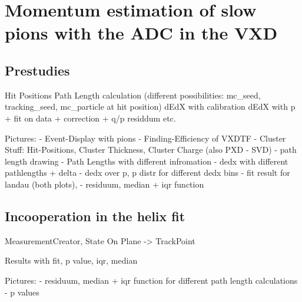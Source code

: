 \chapter{Momentum estimation of slow pions with the ADC in the VXD}

\section{Prestudies}

Hit Positions
Path Length calculation (different possibilities: mc_seed, tracking_seed, mc_particle at hit position)
dEdX with calibration
dEdX with p + fit on data + correction + q/p residdum etc.

Pictures:
- Event-Display with pions
- Finding-Efficiency of VXDTF
- Cluster Stuff: Hit-Positions, Cluster Thickness, Cluster Charge (also PXD - SVD)
- path length drawing
- Path Lengths with different infromation
- dedx with different pathlengths + delta
- dedx over p, p distr for different dedx bins
- fit result for landau (both plots),
- residuum, median + iqr function


\section{Incooperation in the helix fit}

MeasurementCreator, State On Plane -> TrackPoint

Results with fit, p value, iqr, median

Pictures:
- residuum, median + iqr function for different path length calculations
- p values